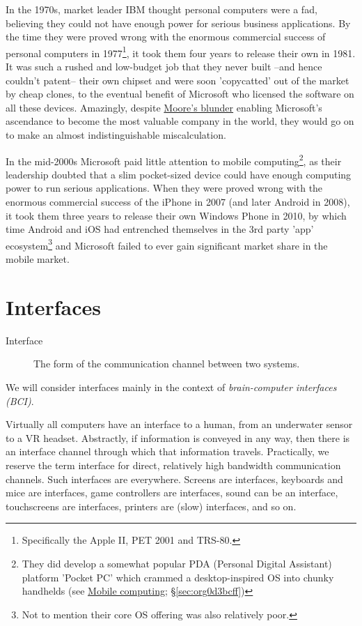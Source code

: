 \documentclass[logo,bsc,singlespacing,parskip]{infthesis}
\begin{document}
In the 1970s, market leader IBM thought personal computers were a fad, believing they could not have enough power for serious business applications.
By the time they were proved wrong with the enormous commercial success of personal computers in 1977\footnote{Specifically the Apple II, PET 2001 and TRS-80.}, it took them four years to release their own in 1981. It was such a rushed and low-budget job that they never built --and hence couldn't patent-- their own chipset and were soon 'copycatted' out of the market by cheap clones, to the eventual benefit of Microsoft who licensed the software on all these devices.
Amazingly, despite \hyperref[org4e0f6c1]{Moore's blunder} enabling Microsoft's ascendance to become the most valuable company in the world, they would go on to make an almost indistinguishable miscalculation.

In the mid-2000s Microsoft paid little attention to mobile computing\footnote{They did develop a somewhat popular PDA (Personal Digital Assistant) platform 'Pocket PC' which crammed a desktop-inspired OS into chunky handhelds (see \hyperref[sec:org0d3bcff]{Mobile computing}; \S \ref{sec:org0d3bcff})}, as their leadership doubted that a slim pocket-sized device could have enough computing power to run serious applications.
When they were proved wrong with the enormous commercial success of the iPhone in 2007 (and later Android in 2008), it took them three years to release their own Windows Phone in 2010, by which time Android and iOS had entrenched themselves in the 3rd party 'app' ecosystem\footnote{Not to mention their core OS offering was also relatively poor.} and Microsoft failed to ever gain significant market share in the mobile market.

\chapter{Interfaces}
\label{sec:org020dbaa}
\begin{mdframed}
\begin{description}
\item[{Interface\label{Interface}}] The form of the communication channel between two systems.
\end{description}
\end{mdframed}

We will consider interfaces mainly in the context of \emph{brain-computer interfaces (BCI)}.

Virtually all computers have an interface to a human, from an underwater sensor to a VR headset.
Abstractly, if information is conveyed in any way, then there is an interface channel through which that information travels.
Practically, we reserve the term interface for direct, relatively high bandwidth communication channels.
Such interfaces are everywhere.
Screens are interfaces, keyboards and mice are interfaces, game controllers are interfaces, sound can be an interface, touchscreens are interfaces, printers are (slow) interfaces, and so on.
\end{document}

